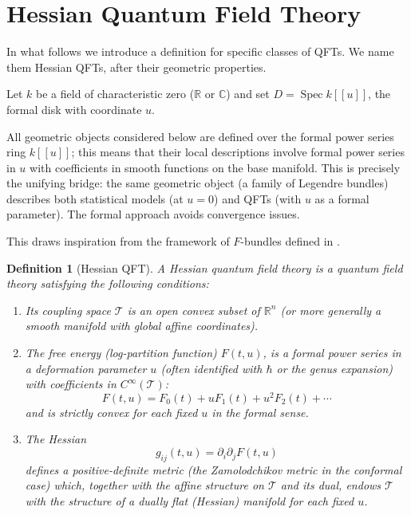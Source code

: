 \documentclass[12pt]{amsart}
\newcommand{\cT}{\mathcal{T}}
\newtheorem{dfn}{Definition}
\begin{document}
\section{Hessian Quantum Field Theory}
In what follows we introduce a definition for specific classes of QFTs. We name them Hessian QFTs, after their geometric properties. 

Let $k$ be a field of characteristic zero ($\mathbb{R}$ or $\mathbb{C}$) and set $D = \operatorname{Spec} k[[u]]$, the formal disk with coordinate $u$. 

\smallskip 

All geometric objects considered below are defined over the formal power series ring $k[[u]]$; this means that their local descriptions involve formal power series in $u$ with coefficients in smooth functions on the base manifold. This is precisely the unifying bridge: the same geometric object (a family of Legendre bundles) describes both statistical models (at $u=0$) and QFTs (with $u$ as a formal parameter). The formal approach avoids convergence issues.

\smallskip 

This  draws inspiration from the framework of $F$-bundles defined in \cite{K,KKP}.


\begin{dfn}[Hessian QFT]\label{D:gQFT}
A Hessian quantum field theory is a quantum field theory satisfying the following conditions:
\begin{enumerate}
    \item Its coupling space $\cT$ is an open convex subset of $\mathbb{R}^n$ (or more generally a smooth manifold with global affine coordinates).
    \item The free energy (log-partition function) $F(t,u)$, is a formal power series in a deformation parameter $u$ (often identified with $\hbar$ or the genus expansion) with coefficients in $C^\infty(\cT)$:
    \[
        F(t,u) = F_0(t) + u F_1(t) + u^2 F_2(t) + \cdots
    \]
     and is strictly convex for each fixed $u$ in the formal sense.

    \item The Hessian
\[
    g_{ij}(t,u) = \partial_i \partial_j F(t,u)
\]
defines a positive-definite metric (the \emph{Zamolodchikov metric} in the conformal case) which, together with the affine structure on $\cT$ and its dual, endows $\cT$ with the structure of a dually flat (Hessian) manifold for each fixed $u$.
\end{enumerate}
\end{dfn}
\end{document}
